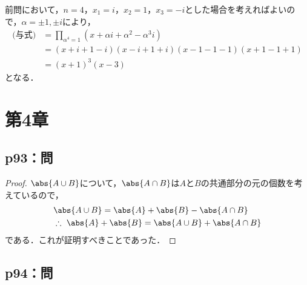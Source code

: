 \documentclass[uplatex,dvipdfmx,a4paper,10pt,fleqn]{jsarticle}
\begin{document}
\begin{leftbar} 
    前問において，$n=4$，$x_1 = i$，$x_2 = 1$，$x_3=-i$とした場合を考えればよいので，$\alpha = \pm 1 , \pm i$により，
    \begin{align*} 
        \text{(与式)} & = \prod_{\alpha^4=1} (x+ \alpha i +\alpha^2 -  \alpha^3i ) \\
        & = (x+i+1-i) (x-i+1+i)(x-1-1-1)(x+1-1+1) \\
        & =(x+1)^3(x-3)
    \end{align*} 
    となる．
\end{leftbar}


\newpage 


\section*{第4章}



\subsection*{p93：問}

\begin{leftbar}
    \begin{proof} 
        $\abs{A \cup B}$について，$ \abs{A \cap B}$は$A$と$B$の共通部分の元の個数を考えているので，
        \begin{align*} 
            & \abs{A \cup B} = \abs{A}+\abs{B} - \abs{A \cap B} \\
            & \therefore ~ \abs{A}+\abs{B} = \abs{A \cup B} + \abs{A \cap B}
        \end{align*} 
        である．これが証明すべきことであった．
    \end{proof}
    \end{leftbar}

    \newpage 


\subsection*{p94：問}
\end{document}
